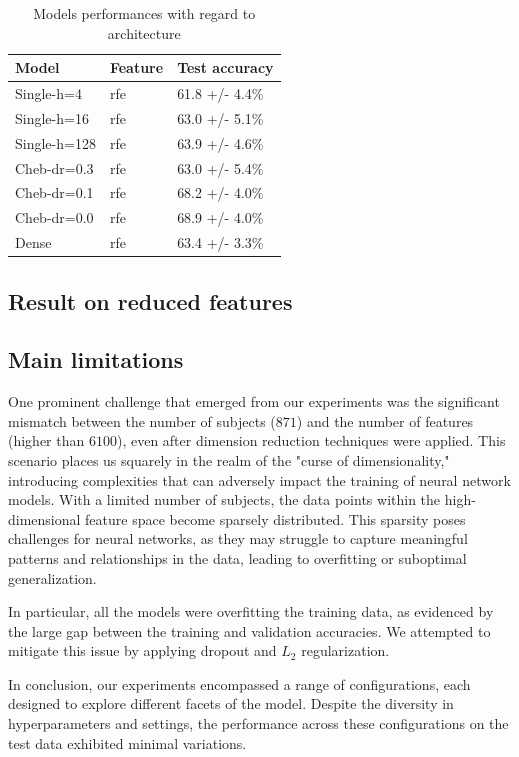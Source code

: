 \begin{table}[H]
	\begin{center}
		\begin{tabular}{lll}
			Model & Feature & Test accuracy \\
			\hline
			Single-h=4 & rfe & 61.8 +/- 4.4\% \\
			Single-h=16 & rfe & 63.0 +/- 5.1\% \\
			Single-h=128 & rfe & 63.9 +/- 4.6\% \\
			Cheb-dr=0.3 & rfe & 63.0 +/- 5.4\% \\
			Cheb-dr=0.1 & rfe & 68.2 +/- 4.0\% \\
			Cheb-dr=0.0 & rfe & 68.9 +/- 4.0\% \\
			Dense & rfe & 63.4 +/- 3.3\% \\
		\end{tabular}
	\end{center}
	\caption{Models performances with regard to architecture}
	\label{table:dependance_on_architecture}
\end{table}


\subsection{Result on reduced features}

\subsection{Main limitations}


One prominent challenge that emerged from our experiments was the significant mismatch between the number of subjects ($871$) and the number of features (higher than $6100$), even after dimension reduction techniques were applied. This scenario places us squarely in the realm of the "curse of dimensionality," introducing complexities that can adversely impact the training of neural network models. With a limited number of subjects, the data points within the high-dimensional feature space become sparsely distributed. This sparsity poses challenges for neural networks, as they may struggle to capture meaningful patterns and relationships in the data, leading to overfitting or suboptimal generalization.

In particular, all the models were overfitting the training data, as evidenced by the large gap between the training and validation accuracies. We attempted to mitigate this issue by applying dropout and $L_2$ regularization. 

In conclusion, our experiments encompassed a range of configurations, each designed to explore different facets of the model. Despite the diversity in hyperparameters and settings, the performance across these configurations on the test data exhibited minimal variations.